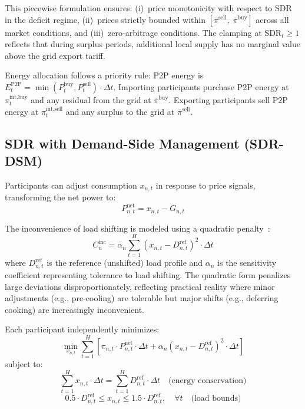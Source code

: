 \documentclass[pdflatex,sn-mathphys-num]{sn-jnl}
\theoremstyle{thmstyleone}
\theoremstyle{thmstyletwo}
\begin{document}
This piecewise formulation ensures: (i)~price monotonicity with respect to SDR in the deficit regime, (ii)~prices strictly bounded within $[\bar{\pi}^{\text{sell}},\; \bar{\pi}^{\text{buy}}]$ across all market conditions, and (iii)~zero-arbitrage conditions. The clamping at $\text{SDR}_t \geq 1$ reflects that during surplus periods, additional local supply has no marginal value above the grid export tariff.

Energy allocation follows a priority rule: P2P energy is $E_t^{\text{P2P}} = \min(P_t^{\text{buy}}, P_t^{\text{sell}}) \cdot \Delta t$. Importing participants purchase P2P energy at $\pi_t^{\text{int,buy}}$ and any residual from the grid at $\bar{\pi}^{\text{buy}}$. Exporting participants sell P2P energy at $\pi_t^{\text{int,sell}}$ and any surplus to the grid at $\bar{\pi}^{\text{sell}}$.

\subsection{SDR with Demand-Side Management (SDR-DSM)}

Participants can adjust consumption $x_{n,t}$ in response to price signals, transforming the net power to:
\begin{equation}
    P_{n,t}^{\text{net}} = x_{n,t} - G_{n,t}
    \label{eq:dsm_net}
\end{equation}

The inconvenience of load shifting is modeled using a quadratic penalty~\cite{alfaverh2023, liu2017}:
\begin{equation}
    C_{n}^{\text{inc}} = \alpha_n \sum_{t=1}^{H} (x_{n,t} - D_{n,t}^{\text{ref}})^2 \cdot \Delta t
    \label{eq:inconvenience}
\end{equation}
where $D_{n,t}^{\text{ref}}$ is the reference (unshifted) load profile and $\alpha_n$ is the sensitivity coefficient representing tolerance to load shifting. The quadratic form penalizes large deviations disproportionately, reflecting practical reality where minor adjustments (e.g., pre-cooling) are tolerable but major shifts (e.g., deferring cooking) are increasingly inconvenient.

Each participant independently minimizes:
\begin{equation}
    \min_{x_{n,t}} \sum_{t=1}^{H} \left[ \pi_{n,t} \cdot P_{n,t}^{\text{net}} \cdot \Delta t + \alpha_n (x_{n,t} - D_{n,t}^{\text{ref}})^2 \cdot \Delta t \right]
    \label{eq:objective}
\end{equation}
subject to:
\begin{equation}
    \sum_{t=1}^{H} x_{n,t} \cdot \Delta t = \sum_{t=1}^{H} D_{n,t}^{\text{ref}} \cdot \Delta t \quad \text{(energy conservation)}
    \label{eq:energy_conservation}
\end{equation}
\begin{equation}
    0.5 \cdot D_{n,t}^{\text{ref}} \leq x_{n,t} \leq 1.5 \cdot D_{n,t}^{\text{ref}}, \quad \forall t \quad \text{(load bounds)}
    \label{eq:load_bounds}
\end{equation}
\end{document}
